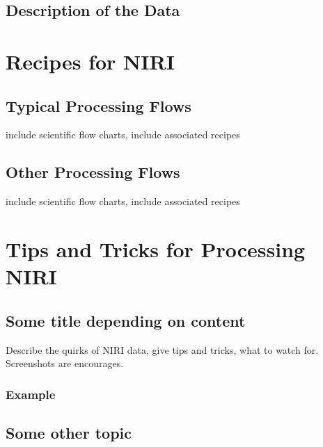 \documentclass[letterpaper,10pt,english]{sphinxmanual}
\begin{document}
\subsection{Description of the Data}
\label{NIRI/instrument:description-of-the-data}

\section{Recipes for NIRI}
\label{NIRI/recipes:niri-recipes-and-flows}\label{NIRI/recipes:recipes-for-niri}\label{NIRI/recipes::doc}

\subsection{Typical Processing Flows}
\label{NIRI/recipes:typical-processing-flows}
include scientific flow charts, include associated recipes


\subsection{Other Processing Flows}
\label{NIRI/recipes:other-processing-flows}
include scientific flow charts, include associated recipes


\section{Tips and Tricks for Processing NIRI}
\label{NIRI/tipstricks:niri-tips-tricks}\label{NIRI/tipstricks::doc}\label{NIRI/tipstricks:tips-and-tricks-for-processing-niri}

\subsection{Some title depending on content}
\label{NIRI/tipstricks:some-title-depending-on-content}
Describe the quirks of NIRI data, give tips
and tricks, what to watch for.  Screenshots are encourages.


\subsubsection{Example}
\label{NIRI/tipstricks:example}

\subsection{Some other topic}
\label{NIRI/tipstricks:some-other-topic}
\end{document}

